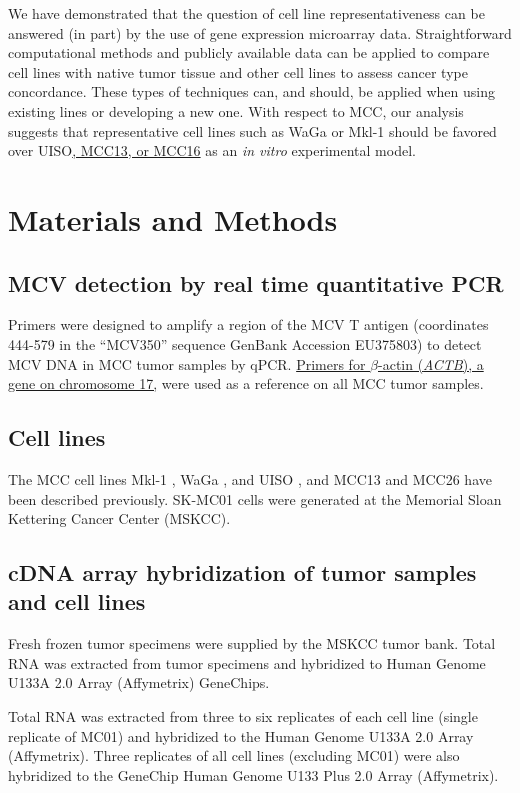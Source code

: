 \documentclass[10pt]{article}
\begin{document}
We have demonstrated that the question of cell line representativeness can be answered (in part) by the use of gene expression microarray data.
Straightforward computational methods and publicly available data can be applied to compare cell lines with native tumor tissue and other cell lines to assess cancer type concordance.
These types of techniques can, and should, be applied when using existing lines or developing a new one.
With respect to MCC, our analysis suggests that representative cell lines such as WaGa or Mkl-1 should be favored over UISO\uline{, MCC13, or MCC16} as an \emph{in vitro} experimental model.

\section*{Materials and Methods}

\subsection*{MCV detection by real time quantitative PCR}

Primers were designed to amplify a region of the MCV T antigen (coordinates 444-579 in the ``MCV350'' sequence GenBank Accession EU375803) to detect MCV DNA in MCC tumor samples by qPCR.
\uline{Primers for $\beta$-actin (\emph{ACTB}), a gene on chromosome 17,} were used as a reference on all MCC tumor samples.

\subsection*{Cell lines}
The MCC cell lines Mkl-1 \citep{Rosen1987Establishment}, WaGa \citep{Houben2010Merkel}, and UISO \citep{Ronan1993Merkel}, and MCC13 and MCC26 \citep{Leonard1995Characterisation} have been described previously.
SK-MC01 cells were generated at the Memorial Sloan Kettering Cancer Center (MSKCC).

\subsection*{cDNA array hybridization of tumor samples and cell lines}
Fresh frozen tumor specimens were supplied by the MSKCC tumor bank.
Total RNA was extracted from tumor specimens and hybridized to Human Genome U133A 2.0 Array (Affymetrix) GeneChips.

Total RNA was extracted from three to six replicates of each cell line (single replicate of MC01) and hybridized to the Human Genome U133A 2.0 Array (Affymetrix).
Three replicates of all cell lines (excluding MC01) were also hybridized to the GeneChip Human Genome U133 Plus 2.0 Array (Affymetrix).
\end{document}
